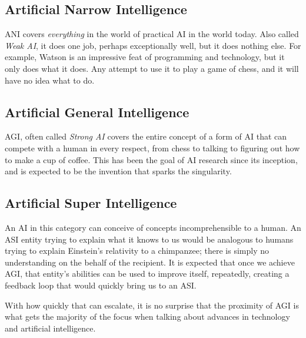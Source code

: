 \documentclass[12pt]{article} %
\begin{document}

\subsection{Artificial Narrow Intelligence} %

ANI covers \textit{everything} in the world of practical AI in the world today. Also called \textit{Weak AI}\cite{wikiani}, it does one job, perhaps exceptionally well, but it does nothing else. For example, Watson is an impressive feat of programming and technology, but it only does what it does. Any attempt to use it to play a game of chess, and it will have no idea what to do.


\subsection{Artificial General Intelligence} %

AGI, often called \textit{Strong AI}\cite{wikiagi} covers the entire concept of a form of AI that can compete with a human in every respect, from chess to talking to figuring out how to make a cup of coffee. This has been the goal of AI research since its inception, and is expected to be the invention that sparks the singularity.


\subsection{Artificial Super Intelligence} %

An AI in this category can conceive of concepts incomprehensible to a human\cite{wbw}. An ASI entity trying to explain what it knows to us would be analogous to humans trying to explain Einstein's relativity to a chimpanzee; there is simply no understanding on the behalf of the recipient. It is expected that once we achieve AGI, that entity's abilities can be used to improve itself, repeatedly, creating a feedback loop that would quickly bring us to an ASI.

With how quickly that can escalate, it is no surprise that the proximity of AGI is what gets the majority of the focus when talking about advances in technology and artificial intelligence. 


\end{document}
